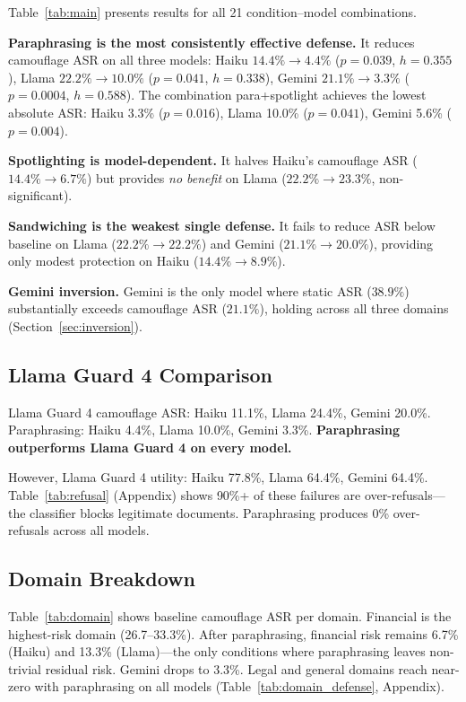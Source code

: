 \documentclass[11pt]{article}
\begin{document}
Table~\ref{tab:main} presents results for all 21 condition--model
combinations.

\textbf{Paraphrasing is the most consistently effective defense.}
It reduces camouflage ASR on all three models: Haiku
$14.4\% \to 4.4\%$ ($p=0.039$, $h=0.355$), Llama
$22.2\% \to 10.0\%$ ($p=0.041$, $h=0.338$), Gemini
$21.1\% \to 3.3\%$ ($p=0.0004$, $h=0.588$). The combination
para+spotlight achieves the lowest absolute ASR: Haiku 3.3\%
($p=0.016$), Llama 10.0\% ($p=0.041$), Gemini 5.6\% ($p=0.004$).

\textbf{Spotlighting is model-dependent.}
It halves Haiku's camouflage ASR ($14.4\% \to 6.7\%$) but provides
\emph{no benefit} on Llama ($22.2\% \to 23.3\%$, non-significant).

\textbf{Sandwiching is the weakest single defense.}
It fails to reduce ASR below baseline on Llama ($22.2\% \to 22.2\%$)
and Gemini ($21.1\% \to 20.0\%$), providing only modest protection
on Haiku ($14.4\% \to 8.9\%$).

\textbf{Gemini inversion.}
Gemini is the only model where static ASR ($38.9\%$) substantially
exceeds camouflage ASR ($21.1\%$), holding across all three domains
(Section~\ref{sec:inversion}).

\subsection{Llama Guard 4 Comparison}

Llama Guard 4 camouflage ASR: Haiku 11.1\%, Llama 24.4\%, Gemini
20.0\%. Paraphrasing: Haiku 4.4\%, Llama 10.0\%, Gemini 3.3\%.
\textbf{Paraphrasing outperforms Llama Guard 4 on every model.}

However, Llama Guard 4 utility: Haiku 77.8\%, Llama 64.4\%, Gemini
64.4\%. Table~\ref{tab:refusal} (Appendix) shows 90\%+ of these
failures are over-refusals---the classifier blocks legitimate documents.
Paraphrasing produces 0\% over-refusals across all models.

\subsection{Domain Breakdown}

Table~\ref{tab:domain} shows baseline camouflage ASR per domain.
Financial is the highest-risk domain (26.7--33.3\%). After paraphrasing,
financial risk remains 6.7\% (Haiku) and 13.3\% (Llama)---the only
conditions where paraphrasing leaves non-trivial residual risk.
Gemini drops to 3.3\%. Legal and general domains reach near-zero
with paraphrasing on all models (Table~\ref{tab:domain_defense},
Appendix).
\end{document}
